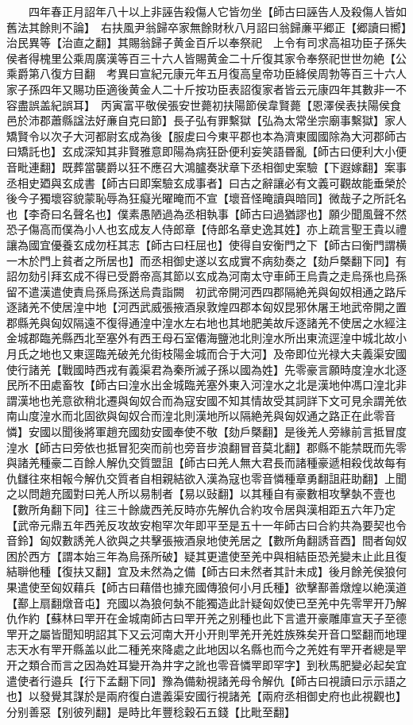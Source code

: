 　　四年春正月詔年八十以上非誣告殺傷人它皆勿坐【師古曰誣告人及殺傷人皆如舊法其餘則不論】　右扶風尹翁歸卒家無餘財秋八月詔曰翁歸亷平郷正【郷讀曰嚮】治民異等【治直之翻】其賜翁歸子黄金百斤以奉祭祀　上令有司求高祖功臣子孫失侯者得槐里公乘周廣漢等百三十六人皆賜黄金二十斤復其家令奉祭祀世世勿絶【公乘爵第八復方目翻　考異曰宣紀元康元年五月復高皇帝功臣絳侯周勃等百三十六人家子孫四年又賜功臣適後黄金人二十斤按功臣表詔復家者皆云元康四年其數非一不容盡誤盖紀誤耳】　丙寅富平敬侯張安世薨初扶陽節侯韋賢薨【恩澤侯表扶陽侯食邑於沛郡蕭縣諡法好亷自克曰節】長子弘有罪繫獄【弘為太常坐宗廟事繫獄】家人矯賢令以次子大河都尉玄成為後【服䖍曰今東平郡也本為濟東國國除為大河郡師古曰矯託也】玄成深知其非賢雅意即陽為病狂卧便利妄笑語昬亂【師古曰便利大小便音毗連翻】既葬當襲爵以狂不應召大鴻臚奏狀章下丞相御史案驗【下遐嫁翻】案事丞相史廼與玄成書【師古曰即案驗玄成事者】曰古之辭讓必有文義可觀故能垂榮於後今子獨壞容貌蒙恥辱為狂癡光曜晻而不宣【壞音怪晻讀與暗同】微哉子之所託名也【李奇曰名聲名也】僕素愚陋過為丞相執事【師古曰過猶謬也】願少聞風聲不然恐子傷高而僕為小人也玄成友人侍郎章【侍郎名章史逸其姓】亦上疏言聖王貴以禮讓為國宜優養玄成勿枉其志【師古曰枉屈也】使得自安衡門之下【師古曰衡門謂横一木於門上貧者之所居也】而丞相御史遂以玄成實不病劾奏之【劾戶槩翻下同】有詔勿劾引拜玄成不得已受爵帝高其節以玄成為河南太守車師王烏貴之走烏孫也烏孫留不遣漢遣使責烏孫烏孫送烏貴詣闕　初武帝開河西四郡隔絶羌與匈奴相通之路斥逐諸羌不使居湟中地【河西武威張掖酒泉敦煌四郡本匈奴昆邪休屠王地武帝開之置郡縣羌與匈奴隔遠不復得通湟中湟水左右地也其地肥美故斥逐諸羌不使居之水經注金城郡臨羌縣西北至塞外有西王母石室僊海鹽池北則湟水所出東流逕湟中城北故小月氏之地也又東逕臨羌破羌允街枝陽金城而合于大河】及帝即位光禄大夫義渠安國使行諸羌【戰國時西戎有義渠君為秦所滅子孫以國為姓】先零豪言願時度湟水北逐民所不田處畜牧【師古曰湟水出金城臨羌塞外東入河湟水之北是漢地仲馮口湟北非謂漢地也羌意欲稍北遷與匈奴合而為寇安國不知其情故受其詞詳下文可見余謂羌依南山度湟水而北固欲與匈奴合而湟北則漢地所以隔絶羌與匈奴通之路正在此零音憐】安國以聞後將軍趙充國劾安國奉使不敬【劾戶槩翻】是後羌人旁緣前言抵冒度湟水【師古曰旁依也抵冒犯突而前也旁音步浪翻冒音莫北翻】郡縣不能禁既而先零與諸羌種豪二百餘人解仇交質盟詛【師古曰羌人無大君長而諸種豪遞相殺伐故每有仇讎往來相報今解仇交質者自相親結欲入漢為寇也零音憐種章勇翻詛莊助翻】上聞之以問趙充國對曰羌人所以易制者【易以䜴翻】以其種自有豪數相攻擊埶不壹也【數所角翻下同】往三十餘歲西羌反時亦先解仇合約攻令居與漢相距五六年乃定【武帝元鼎五年西羌反攻故安枹罕次年即平至是五十一年師古曰合約共為要契也令音鈴】匈奴數誘羌人欲與之共擊張掖酒泉地使羌居之【數所角翻誘音酉】間者匈奴困於西方【謂本始三年為烏孫所破】疑其更遣使至羌中與相結臣恐羌變未止此且復結聨他種【復扶又翻】宜及未然為之備【師古曰未然者其計未成】後月餘羌侯狼何果遣使至匈奴藉兵【師古曰藉借也據充國傳狼何小月氏種】欲擊鄯善燉煌以絶漢道【鄯上扇翻燉音屯】充國以為狼何埶不能獨造此計疑匈奴使已至羌中先零䍐开乃解仇作約【蘇林曰䍐开在金城南師古曰䍐开羌之别種也此下言遣开豪雕庫宣天子至德䍐开之屬皆聞知明詔其下又云河南大开小开則䍐羌开羌姓族殊矣开音口堅翻而地理志天水有䍐开縣盖以此二種羌來降處之此地因以名縣也而今之羌姓有䍐开者總是䍐开之類合而言之因為姓耳變开為井字之訛也零音憐䍐即罕字】到秋馬肥變必起矣宜遣使者行邉兵【行下孟翻下同】豫為備勑視諸羌母令解仇【師古曰視讀曰示示語之也】以發覺其謀於是兩府復白遣義渠安國行視諸羌【兩府丞相御史府也此視觀也】分别善惡【别彼列翻】是時比年豐稔穀石五錢【比毗至翻】

